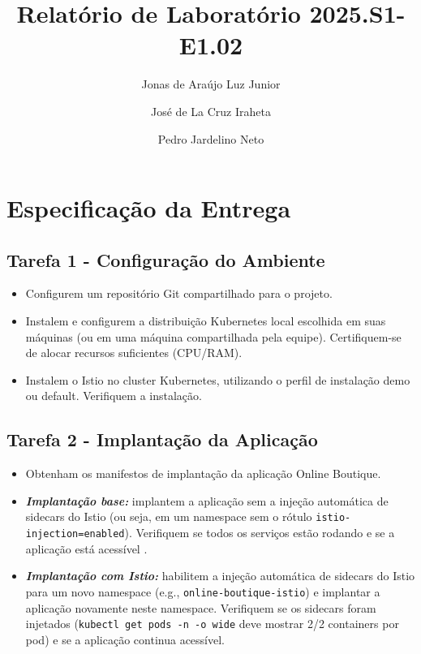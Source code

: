 \documentclass[9pt,a4paper,twocolumn,twoside]{tau-class/tau}
\title{Relatório de Laboratório 2025.S1-E1.02}
\author[a,1]{Jonas de Araújo Luz Junior}
\author[a,2]{José de La Cruz Iraheta}
\author[a,3]{Pedro Jardelino Neto}
\affil[a]{Universidade de Fortaleza (Unifor)}
\begin{document}
		
    \maketitle 
    \thispagestyle{firststyle} 
    \tauabstract 
    

\section{Especificação da Entrega}

\subsection{Tarefa 1 - Configuração do Ambiente}
\begin{itemize}
    \item Configurem um repositório Git compartilhado para o projeto.
    \item Instalem e configurem a distribuição Kubernetes local escolhida em suas máquinas (ou em uma máquina compartilhada pela equipe). Certifiquem-se de alocar recursos suficientes (CPU/RAM).
    \item Instalem o Istio no cluster Kubernetes, utilizando o perfil de instalação demo ou default. Verifiquem a instalação.
\end{itemize}

\subsection{Tarefa 2 - Implantação da Aplicação}
\begin{itemize}
    \item Obtenham os manifestos de implantação da aplicação Online Boutique.
    \item \textbf{\textit{Implantação base:}} implantem a aplicação sem a injeção automática de sidecars do Istio (ou seja, em um namespace sem o rótulo \texttt{istio-injection=enabled}). Verifiquem se todos os serviços estão rodando e se a aplicação está acessível .
    \item \textbf{\textit{Implantação com Istio:}} habilitem a injeção automática de sidecars do Istio para um novo namespace (e.g., \texttt{online-boutique-istio}) e implantar a aplicação novamente neste namespace. Verifiquem se os sidecars foram injetados (\texttt{kubectl get pods -n -o wide} deve mostrar 2/2 containers por pod) e se a aplicação continua acessível.
\end{itemize}
\end{document}
